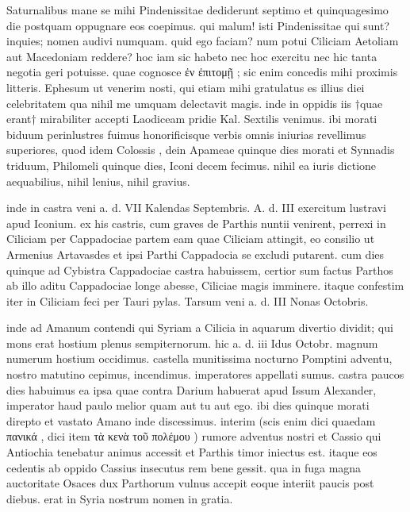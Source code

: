 


 Saturnalibus mane se mihi Pindenissitae dediderunt septimo et quinquagesimo die postquam oppugnare eos coepimus. qui malum! isti Pindenissitae qui sunt? inquies; nomen audivi numquam. quid ego faciam? num potui Ciliciam Aetoliam aut Macedoniam reddere? hoc iam sic habeto nec hoc exercitu nec hic tanta negotia geri potuisse. quae cognosce ἐν ἐπιτομῇ ; sic enim concedis mihi proximis litteris. Ephesum ut venerim nosti, qui etiam mihi gratulatus es illius diei celebritatem qua nihil me umquam delectavit magis. inde in oppidis iis †quae erant† mirabiliter accepti Laodiceam pridie Kal. Sextilis venimus. ibi morati biduum perinlustres fuimus honorificisque verbis omnis iniurias revellimus superiores, quod idem Colossis , dein Apameae quinque dies morati et Synnadis triduum, Philomeli quinque dies, Iconi decem fecimus. nihil ea iuris dictione aequabilius, nihil lenius, nihil gravius.

 inde in castra veni a. d. VII Kalendas Septembris. A. d. III exercitum lustravi apud Iconium. ex his castris, cum graves de Parthis nuntii venirent, perrexi in Ciliciam per Cappadociae partem eam quae Ciliciam attingit, eo consilio ut Armenius Artavasdes et ipsi Parthi Cappadocia se excludi putarent. cum dies quinque ad Cybistra Cappadociae castra habuissem, certior sum factus Parthos ab illo aditu Cappadociae longe abesse, Ciliciae magis imminere. itaque confestim iter in Ciliciam feci per Tauri pylas. Tarsum veni a. d. III Nonas Octobris.

 inde ad Amanum contendi qui Syriam a Cilicia in aquarum divertio dividit; qui mons erat hostium plenus sempiternorum. hic a. d. iii Idus Octobr. magnum numerum hostium occidimus. castella munitissima nocturno Pomptini adventu, nostro matutino cepimus, incendimus. imperatores appellati sumus. castra paucos dies habuimus ea ipsa quae contra Darium habuerat apud Issum Alexander, imperator haud paulo melior quam aut tu aut ego. ibi dies quinque morati direpto et vastato Amano inde discessimus. interim (scis enim dici quaedam πανικά , dici item τὰ κενὰ τοῦ πολέμου ) rumore adventus nostri et Cassio qui Antiochia tenebatur animus accessit et Parthis timor iniectus est. itaque eos cedentis ab oppido Cassius insecutus rem bene gessit. qua in fuga magna auctoritate Osaces dux Parthorum vulnus accepit eoque interiit paucis post diebus. erat in Syria nostrum nomen in gratia.

